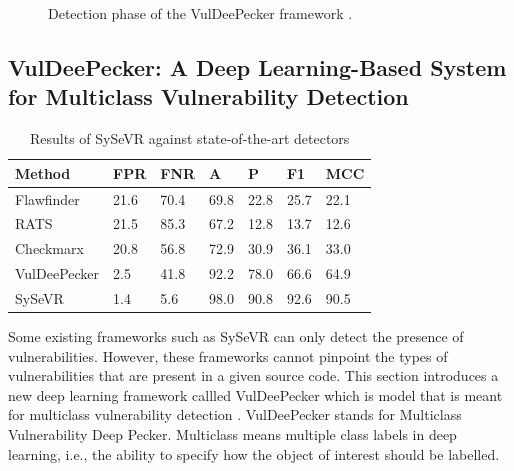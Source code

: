 \documentclass[12pt,twocolumn,letterpaper]{article}
\begin{document}
\begin{figure}[h!]
    \centering
    \caption{Detection phase of the VulDeePecker framework \cite{Zou21}.}
    \label{fig:af-1}
\end{figure}

\subsection{VulDeePecker: A Deep Learning-Based System for Multiclass Vulnerability Detection}
\label{sub:vuledeepecker}


\begin{table}[h!]
    \centering
    \begin{tabular}{lllllll}
    \hline
    Method       & FPR  & FNR  & A    & P    & F1   & MCC  \\ \hline
    Flawfinder   & 21.6 & 70.4 & 69.8 & 22.8 & 25.7 & 22.1 \\
    RATS         & 21.5 & 85.3 & 67.2 & 12.8 & 13.7 & 12.6 \\
    Checkmarx    & 20.8 & 56.8 & 72.9 & 30.9 & 36.1 & 33.0 \\
    VulDeePecker & 2.5  & 41.8 & 92.2 & 78.0 & 66.6 & 64.9 \\
    SySeVR       & 1.4  & 5.6  & 98.0 & 90.8 & 92.6 & 90.5 \\ \hline
    \end{tabular}
    \caption{Results of SySeVR against state-of-the-art detectors}
    \label{tab:sys}
\end{table}

Some existing frameworks such as SySeVR can only detect the presence of vulnerabilities. However, these 
frameworks cannot pinpoint the types of vulnerabilities that are present in a given source code. This 
section introduces a new deep learning framework callled VulDeePecker which is model that is meant for 
multiclass vulnerability detection \cite{Zou21}.  VulDeePecker stands for Multiclass Vulnerability Deep Pecker.
Multiclass means multiple class labels in deep learning, i.e., the ability to specify how the object of interest 
should be labelled.
\end{document}
